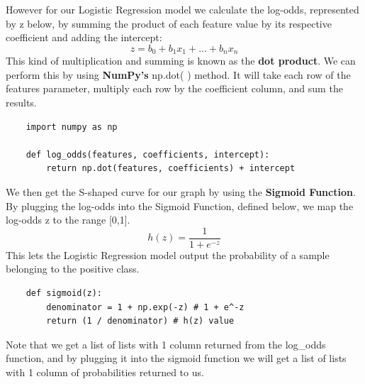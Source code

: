 \documentclass[11pt, a4paper]{article}
\begin{document}
\begin{spacing}{1.1}
	However for our Logistic Regression model we calculate the log-odds, represented by z below, by summing the product of each feature value by its respective coefficient and adding the intercept: $$ z = b_0 + b_1x_1 + ... + b_nx_n $$
	This kind of multiplication and summing is known as the \textbf{dot product}. We can perform this by using \textbf{NumPy's} np.dot( ) method. It will take each row of the features parameter, multiply each row by the coefficient column, and sum the results.  
	\begin{lstlisting}
	import numpy as np
	
	def log_odds(features, coefficients, intercept):
		return np.dot(features, coefficients) + intercept \end{lstlisting} \vspace*{1mm}
	We then get the S-shaped curve for our graph by using the \textbf{Sigmoid Function}. By plugging the log-odds into the Sigmoid Function, defined below, we map the log-odds z to the range [0,1]. $$ h(z) = \frac{1}{1 + e^{-z}}$$ This lets the Logistic Regression model output the probability of a sample belonging to the positive class.
	\begin{lstlisting}
	def sigmoid(z):
		denominator = 1 + np.exp(-z) # 1 + e^-z
		return (1 / denominator) # h(z) value \end{lstlisting} \vspace*{1mm}
	Note that we get a list of lists with 1 column returned from the log\_odds function, and by plugging it into the sigmoid function we will get a list of lists with 1 column of probabilities returned to us. \newpage


\end{spacing}
\end{document}
